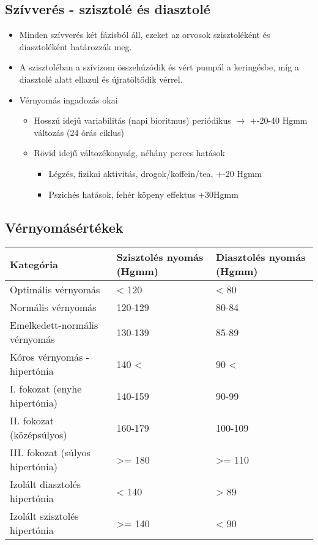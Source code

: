 \subsection{Szívverés - szisztolé és diasztolé}
\begin{itemize}
    \item Minden szívverés két fázisból áll, ezeket az orvosok szisztoléként és diasztoléként határozzák meg.
    \item A szisztoléban a szívizom összehúzódik és vért pumpál a keringésbe, míg a diasztolé alatt ellazul és újratöltődik vérrel.
    \item Vérnyomás ingadozás okai
    \begin{itemize}
        \item Hosszú idejű variabilitás (napi bioritmus) periódikus $\rightarrow$ +-20-40 Hgmm változás (24 órás ciklus)
        \item Rövid idejű változékonyság, néhány perces hatások
        \begin{itemize}
            \item Légzés, fizikai aktivitás, drogok/koffein/tea, +-20 Hgmm
            \item Pszichés hatások, fehér köpeny effektus +30Hgmm
        \end{itemize}
    \end{itemize}
\end{itemize}

\subsection{Vérnyomásértékek}
\begin{table}[h!]
    \centering
    \footnotesize
    \begin{tabularx}{\textwidth}{|X|X|X|}
    \hline
    \textbf{Kategória} & \textbf{Szisztolés nyomás (Hgmm)} & \textbf{Diasztolés nyomás (Hgmm)} \\ \hline
    Optimális vérnyomás & < 120 & < 80 \\ \hline
    Normális vérnyomás & 120-129 & 80-84 \\ \hline
    Emelkedett-normális vérnyomás & 130-139 & 85-89 \\ \hline
    Kóros vérnyomás - hipertónia & 140 < & 90 < \\ \hline
    I. fokozat (enyhe hipertónia) & 140-159 & 90-99 \\ \hline
    II. fokozat (középsúlyos) & 160-179 & 100-109 \\ \hline
    III. fokozat (súlyos hipertónia) & >= 180 & >= 110 \\ \hline
    Izolált diasztolés hipertónia & < 140 & > 89 \\ \hline
    Izolált szisztolés hipertónia & >= 140 & < 90 \\ \hline
    \end{tabularx}
    \label{your_label_here}
\end{table}

